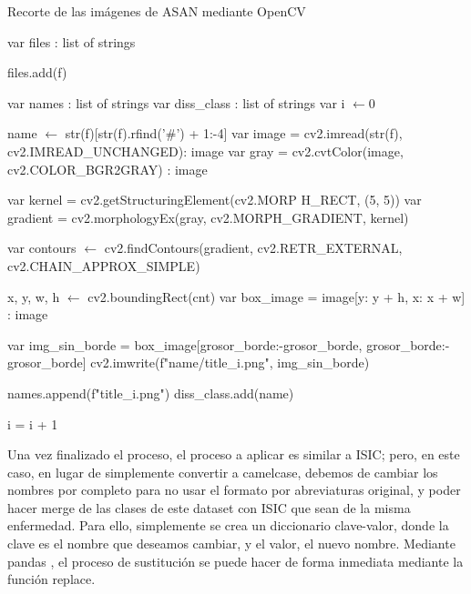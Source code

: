 \begin{algorithm}[H]

		\caption{Recorte de las imágenes de ASAN mediante OpenCV}
		\label{cortarasan}
		\begin{algorithmic}
			\State var files : list of strings
			
			 	 \If {f is\_file()]}
			 	 	\State files.add(f)
			 	 \EndIf
			 \EndFor
			 	 
			\State var names : list of strings
			\State var  diss\_class : list of strings
			 \State var i $\gets 0$
			
				   \State name $\gets$ str(f)[str(f).rfind('\#') + 1:-4]
						\State var image = cv2.imread(str(f), cv2.IMREAD\_UNCHANGED): image
						\State var gray = cv2.cvtColor(image, cv2.COLOR\_BGR2GRAY) : image
			
						\State var kernel = cv2.getStructuringElement(cv2.MORP H\_RECT, (5, 5))
						\State var gradient = cv2.morphologyEx(gray, cv2.MORPH\_GRADIENT, kernel)
			
						\State var contours $\gets$ cv2.findContours(gradient, cv2.RETR\_EXTERNAL, cv2.CHAIN\_APPROX\_SIMPLE)
			
								\State	x, y, w, h  $\gets$ cv2.boundingRect(cnt)
								\State var box\_image = image[y: y + h, x: x + w] : image
				
								\State var img\_sin\_borde = box\_image[grosor\_borde:-grosor\_borde, grosor\_borde:-grosor\_borde]
								\State cv2.imwrite(f"{name}/{title}\_{i}.png", img\_sin\_borde)
					
								\State names.append(f"{title}\_{i}.png")
								\State diss\_class.add(name)
								
								\State i = i + 1
						 \EndFor
				\EndIf	 
	\EndFor
				
\EndProcedure
\end{algorithmic}
\end{algorithm}

Una vez finalizado el proceso, el proceso a aplicar es similar a ISIC; pero, en este caso, en lugar de simplemente convertir a camelcase, debemos de cambiar los nombres por completo para no usar el formato por abreviaturas original, y poder hacer merge de las clases de este dataset con ISIC que sean de la misma enfermedad. Para ello, simplemente se crea un diccionario clave-valor, donde la clave es el nombre que deseamos cambiar, y el valor, el nuevo nombre. Mediante pandas \cite{reback2020pandas}, el proceso de sustitución se puede hacer de forma inmediata mediante la función replace.

